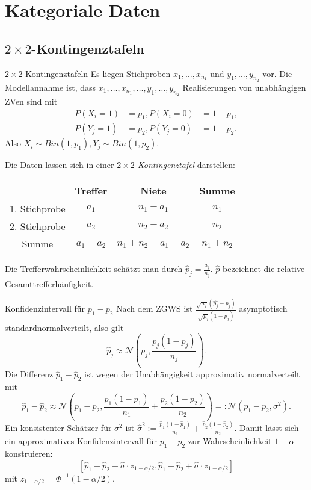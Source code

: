 \section{Kategoriale Daten}

\subsection{\(2\times 2\)-Kontingenztafeln}

\begin{karte}{\(2\times 2\)-Kontingenztafeln}
Es liegen Stichproben \(x_{1}, \ldots, x_{n_1}\) und \(y_1, \ldots, y_{n_2}\) vor. Die Modellannahme ist, dass 
\(x_1, \ldots, x_{n_1}, \ldots, y_1, \ldots, y_{n_2}\) Realisierungen von unabhängigen ZVen sind mit 
\begin{align*}
    P(X_i = 1) &= p_1, P(X_i = 0) &= 1 - p_1, \\
    P(Y_j = 1) &= p_2, P(Y_j = 0) &= 1 - p_2.
\end{align*}
Also \(X_i \sim Bin(1, p_1), Y_j \sim Bin(1, p_2)\).

Die Daten lassen sich in einer \textit{\(2\times 2\)-Kontingenztafel} darstellen:

\begin{tabular}{c|cc|c}
    & Treffer & Niete & Summe \\
    \hline
    1. Stichprobe & \(a_1\) & \(n_1 - a_1\) & \(n_1\) \\
    2. Stichprobe & \(a_2\) & \(n_2 - a_2\) & \(n_2\) \\
    \hline
    Summe & \(a_1 + a_2\) & \(n_1 + n_2 - a_1 - a_2\) & \(n_1 + n_2\)
\end{tabular}

Die Trefferwahrscheinlichkeit schätzt man durch \(\hat{p}_j = \frac{a_j}{n_j}\).
\(\hat{p}\) bezeichnet die relative Gesamttrefferhäufigkeit.
\end{karte}

\begin{karte}{Konfidenzintervall für \(p_1 - p_2\)}
Nach dem ZGWS ist \( \frac{\sqrt{n_j} (\hat{p_j} - p_j)}{\sqrt{p_j}(1-p_j)} \) asymptotisch standardnormalverteilt, 
also gilt 
\[ \hat{p}_j \approx \mathcal{N}\left( p_j, \frac{p_j(1-p_j)}{n_j} \right). \]
Die Differenz \(\hat{p}_1 - \hat{p}_2\) ist wegen der Unabhängigkeit approximativ normalverteilt mit 
\[ \hat{p}_1 - \hat{p}_2 \approx \mathcal{N}\left( p_1 - p_2, \frac{p_1(1-p_1)}{n_1} + \frac{p_2 (1-p_2)}{n_2} \right) =: \mathcal{N}(p_1-p_2, \sigma^2). \]
Ein konsistenter Schätzer für \(\sigma^2\) ist \(\hat{\sigma}^2 := \frac{\hat{p}_1(1-\hat{p}_1)}{n_1} + \frac{\hat{p}_2(1-\hat{p}_2)}{n_2} \).
Damit lässt sich ein approximatives Konfidenzintervall für \(p_1 - p_2\) zur Wahrscheinlichkeit \(1-\alpha\) konstruieren:
\[ [ \hat{p}_1 - \hat{p}_2 - \hat{\sigma} \cdot z_{1-\alpha/2}, \hat{p}_1 - \hat{p}_2 + \hat{\sigma} \cdot z_{1-\alpha/2} ] \]
mit \(z_{1-\alpha/2} = \Phi^{-1}(1-\alpha/2)\).
\end{karte}

